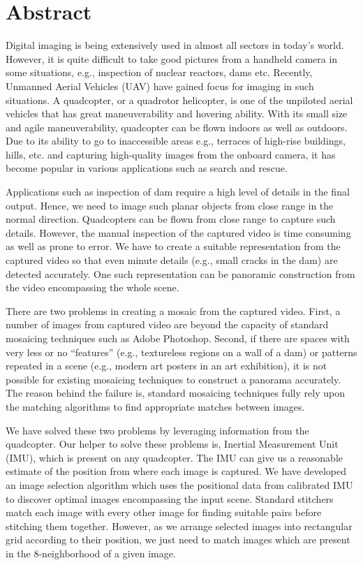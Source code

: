 \chapter*{Abstract}
\thispagestyle{empty}
Digital imaging is being extensively used in almost all sectors in today's
world. However, it is quite difficult to take good pictures from a handheld
camera in some situations, e.g., inspection of nuclear reactors, dams etc. Recently, Unmanned
Aerial Vehicles (UAV) have gained focus for imaging in such situations. A
quadcopter, or a quadrotor helicopter, is one of the unpiloted aerial vehicles
that has great maneuverability and hovering ability. With its small size and
agile maneuverability, quadcopter can be flown indoors as well as
outdoors. Due to its ability to go to inaccessible areas e.g., terraces of
high-rise buildings, hills, etc. and capturing high-quality images from the
onboard camera, it has become popular in various applications such as search and
rescue.

Applications such as inspection of dam require a high level of details in the
final output. Hence, we need to image such planar objects from close range in
the normal direction. Quadcopters can be flown from close range to capture such
details. However, the manual inspection of the captured video is time consuming
as well as prone to error. We have to create a suitable representation from the
captured video so that even minute details (e.g., small cracks in the dam) are
detected accurately. One such representation can be panoramic construction from
the video encompassing the whole scene. 

There are two problems in creating a mosaic from the captured video. First,
a number of images from captured video are beyond the capacity of standard
mosaicing techniques such as Adobe Photoshop. Second, if there are spaces with very less
or no ``features'' (e.g., textureless regions on a wall of a dam) or patterns
repeated in a scene (e.g., modern art posters in an art exhibition), it is not possible for existing
mosaicing techniques to construct a panorama accurately. The reason behind 
the failure is, standard mosaicing techniques fully rely upon the matching
algorithms to find appropriate matches between images. 

We have solved these two problems by leveraging information from the quadcopter.
Our helper to solve these problems is, Inertial Measurement Unit (IMU),
which is present on any quadcopter. The IMU can give us a reasonable estimate of
the position from where each image is captured. We have developed an image selection
algorithm which uses the positional data from calibrated IMU to discover optimal
images encompassing the input scene. Standard stitchers match each image
with every other image for finding suitable pairs before stitching them
together. However, as we arrange selected images into rectangular grid
according to their position, we just need to match images which are present in
the 8-neighborhood of a given image.

